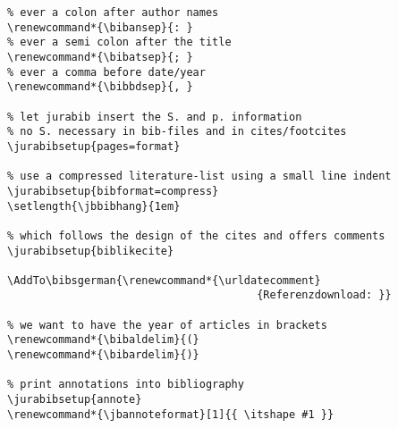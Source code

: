 \begin{verbatim}
% ever a colon after author names 
\renewcommand*{\bibansep}{: }
% ever a semi colon after the title 
\renewcommand*{\bibatsep}{; }
% ever a comma before date/year
\renewcommand*{\bibbdsep}{, }

% let jurabib insert the S. and p. information
% no S. necessary in bib-files and in cites/footcites
\jurabibsetup{pages=format}

% use a compressed literature-list using a small line indent
\jurabibsetup{bibformat=compress}
\setlength{\jbbibhang}{1em}

% which follows the design of the cites and offers comments
\jurabibsetup{biblikecite}

\AddTo\bibsgerman{\renewcommand*{\urldatecomment}
                                       {Referenzdownload: }}

% we want to have the year of articles in brackets
\renewcommand*{\bibaldelim}{(}
\renewcommand*{\bibardelim}{)}

% print annotations into bibliography
\jurabibsetup{annote}
\renewcommand*{\jbannoteformat}[1]{{ \itshape #1 }}

\end{verbatim}
\normalsize